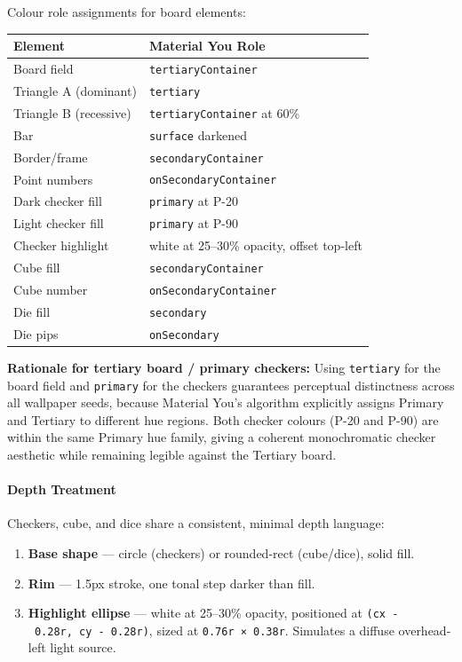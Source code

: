 \documentclass[11pt,a4paper]{article}
\providecommand{\tightlist}{\setlength{\itemsep}{2pt}\setlength{\parskip}{0pt}}
\begin{document}
Colour role assignments for board elements:

\begin{longtable}[]{@{}ll@{}}
\toprule\noalign{}
Element & Material You Role \\
\midrule\noalign{}
\endhead
\bottomrule\noalign{}
\endlastfoot
Board field & \texttt{tertiaryContainer} \\
Triangle A (dominant) & \texttt{tertiary} \\
Triangle B (recessive) & \texttt{tertiaryContainer} at 60\% \\
Bar & \texttt{surface} darkened \\
Border/frame & \texttt{secondaryContainer} \\
Point numbers & \texttt{onSecondaryContainer} \\
Dark checker fill & \texttt{primary} at P-20 \\
Light checker fill & \texttt{primary} at P-90 \\
Checker highlight & white at 25--30\% opacity, offset top-left \\
Cube fill & \texttt{secondaryContainer} \\
Cube number & \texttt{onSecondaryContainer} \\
Die fill & \texttt{secondary} \\
Die pips & \texttt{onSecondary} \\
\end{longtable}

\textbf{Rationale for tertiary board / primary checkers:} Using
\texttt{tertiary} for the board field and \texttt{primary} for the
checkers guarantees perceptual distinctness across all wallpaper seeds,
because Material You's algorithm explicitly assigns Primary and Tertiary
to different hue regions. Both checker colours (P-20 and P-90) are
within the same Primary hue family, giving a coherent monochromatic
checker aesthetic while remaining legible against the Tertiary board.

\paragraph{Depth Treatment}\label{depth-treatment}

Checkers, cube, and dice share a consistent, minimal depth language:

\begin{enumerate}
\def\labelenumi{\arabic{enumi}.}
\tightlist
\item
  \textbf{Base shape} --- circle (checkers) or rounded-rect (cube/dice),
  solid fill.
\item
  \textbf{Rim} --- 1.5px stroke, one tonal step darker than fill.
\item
  \textbf{Highlight ellipse} --- white at 25--30\% opacity, positioned
  at \texttt{(cx\ -\ 0.28r,\ cy\ -\ 0.28r)}, sized at
  \texttt{0.76r\ ×\ 0.38r}. Simulates a diffuse overhead-left light
  source.
\end{enumerate}
\end{document}
